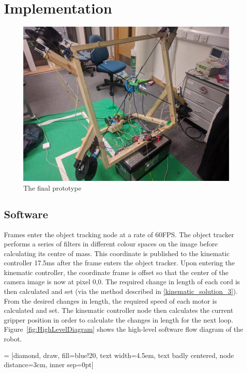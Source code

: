 \documentclass[conference]{IEEEtran}
\begin{document}
	
	
	\section{Implementation}
	\begin{figure}\label{fullPicture}
		\centering
		
		\includegraphics[scale=0.23]{finished_robot.jpg}
		\caption{The final prototype}
	\end{figure}
	\subsection{Software}
	Frames enter the object tracking node at a rate of 60FPS. The object tracker performs a series of filters in different colour spaces on the image before calculating its centre of mass. This coordinate is published to the kinematic controller 17.5ms after the frame enters the object tracker. Upon entering the kinematic controller, the coordinate frame is offset so that the center of the camera image is now at pixel 0,0. The required change in length of each cord is then calculated and set (via the method described in \ref{kinematic_solution_3}). From the desired changes in length, the required speed of each motor is calculated and set. The kinematic controller node then calculates the current gripper position in order to calculate the changes in length for the next loop.
	Figure~\ref{fig:HighLevelDiagram} shows the high-level software flow diagram of the robot.

	
	
	 = [diamond, draw, fill=blue!20, 
	text width=4.5em, text badly centered, node distance=3cm, inner sep=0pt]
	
\end{document}
